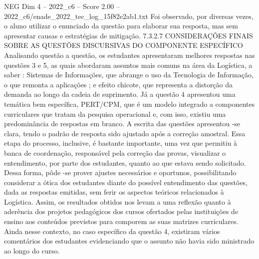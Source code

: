 \begin{textsample}{NEG Dim 4 – 2022\_c6 – Score 2.00 – 2022\_c6/enade\_2022\_tec\_log\_15f82e2ab1.txt}
Foi observado, por diversas vezes, o aluno utilizar o enunciado da questão para elaborar sua resposta, mas sem apresentar causas e estratégias de mitigação. 7.3.2.7 CONSIDERAÇÕES FINAIS SOBRE AS QUESTÕES DISCURSIVAS DO COMPONENTE ESPECÍFICO Analisando questão a questão, os estudantes apresentaram melhores respostas nas questões 3 e 5, as quais abordaram assuntos mais comuns na área da Logística, a saber : Sistemas de Informações, que abrange o uso da Tecnologia de Informação, o que remonta a aplicações ; e efeito chicote, que representa a distorção da demanda ao longo da cadeia de suprimento.
Já a questão 4 apresentou uma temática bem específica, PERT/CPM, que é um modelo integrado a componentes curriculares que tratam da pesquisa operacional e, com isso, existiu uma predominância de respostas em branco.
A escrita das questões apresentou -se clara, tendo o padrão de resposta sido ajustado após a correção amostral.
Essa etapa do processo, inclusive, é bastante importante, uma vez que permitiu à banca de coordenação, responsável pela correção das provas, visualizar o entendimento, por parte dos estudantes, quanto ao que estava sendo solicitado.
Dessa forma, pôde -se prover ajustes necessários e oportunos, possibilitando considerar a ótica dos estudantes diante do possível entendimento das questões, dada as respostas emitidas, sem ferir os aspectos teóricos relacionados à Logística.
Assim, os resultados obtidos nos levam a uma reflexão quanto à aderência dos projetos pedagógicos dos cursos ofertados pelas instituições de ensino aos conteúdos previstos para comporem as suas matrizes curriculares.
Ainda nesse contexto, no caso específico da questão 4, existiram vários comentários dos estudantes evidenciando que o assunto não havia sido ministrado ao longo do curso.

\end{textsample}
